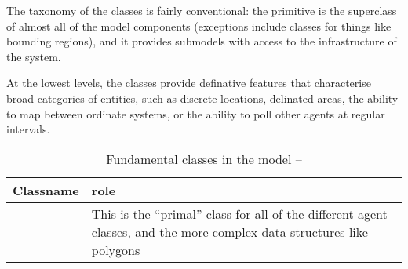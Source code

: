 The taxonomy of the classes is fairly conventional: the primitive
\magent is the superclass of almost all of the model components
(exceptions include classes for things like bounding regions), and it
provides submodels with access to the infrastructure of the system. 

At the lowest levels, the classes provide definative features that
characterise broad categories of entities, such as discrete locations,
delinated areas, the ability to map between ordinate systems, or the
ability to poll other agents at regular intervals.

\begin{table}[H]
\begin{center}
  \caption{Fundamental classes in the model -- \label{classtable1}}
  \begin{tabular}{l L{7cm}}
    \toprule 
    \textbf{Classname} & \textbf{role} \\
    \midrule
     & This is the ``primal'' class for all of the
      different agent classes, and the more complex data structures
        like polygons  \\


\end{tabular}
\end{center}
\end{table}
